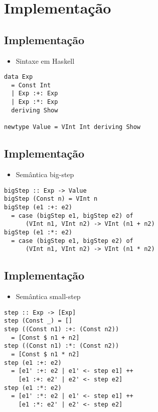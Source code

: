 \documentclass[11pt]{article}
\begin{document}
\section*{Implementação}
\label{sec:orgb865781}

\subsection*{Implementação}
\label{sec:org3af3099}

\begin{itemize}
\item Sintaxe em Haskell
\end{itemize}

\begin{verbatim}
data Exp
  = Const Int
  | Exp :+: Exp
  | Exp :*: Exp
  deriving Show

newtype Value = VInt Int deriving Show
\end{verbatim}
\subsection*{Implementação}
\label{sec:orgf164b47}

\begin{itemize}
\item Semântica big-step
\end{itemize}

\begin{verbatim}
bigStep :: Exp -> Value
bigStep (Const n) = VInt n
bigStep (e1 :+: e2)
  = case (bigStep e1, bigStep e2) of
      (VInt n1, VInt n2) -> VInt (n1 + n2)
bigStep (e1 :*: e2)
  = case (bigStep e1, bigStep e2) of
      (VInt n1, VInt n2) -> VInt (n1 * n2)
\end{verbatim}
\subsection*{Implementação}
\label{sec:org17348bd}

\begin{itemize}
\item Semântica small-step
\end{itemize}

\begin{verbatim}
step :: Exp -> [Exp]
step (Const _) = []
step ((Const n1) :+: (Const n2))
  = [Const $ n1 + n2]
step ((Const n1) :*: (Const n2))
  = [Const $ n1 * n2]
step (e1 :+: e2)
  = [e1' :+: e2 | e1' <- step e1] ++
    [e1 :+: e2' | e2' <- step e2]
step (e1 :*: e2)
  = [e1' :*: e2 | e1' <- step e1] ++
    [e1 :*: e2' | e2' <- step e2]
\end{verbatim}
\end{document}
